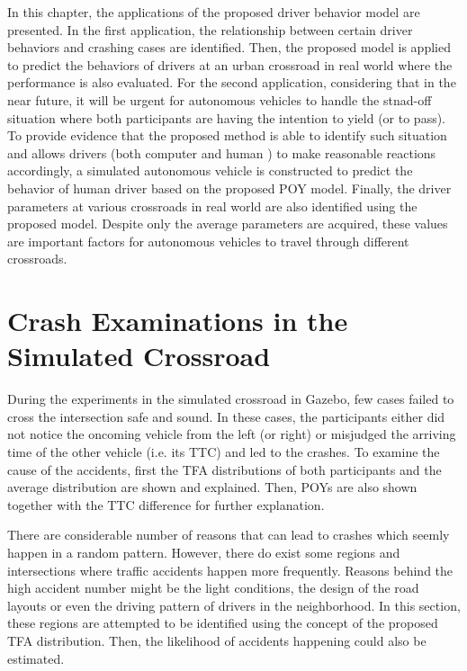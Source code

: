 
In this chapter, the applications of the proposed driver behavior model are presented. In the first application, the relationship between certain driver behaviors and crashing cases are identified. Then, the proposed model is applied to predict the behaviors of drivers at an urban crossroad in real world where the performance is also evaluated. For the second application, considering that in the near future, it will be urgent for autonomous vehicles to handle the stnad-off situation where both participants are having the intention to yield (or to pass). To provide evidence that the proposed method is able to identify such situation and allows drivers (both computer and human ) to make reasonable reactions accordingly, a simulated autonomous vehicle is constructed to predict the behavior of human driver based on the proposed POY model. Finally, the driver parameters at various crossroads in real world are also identified using the proposed model. Despite only the average parameters are acquired, these values are important factors for autonomous vehicles to travel through different crossroads.   





\section{Crash Examinations in the Simulated Crossroad}
\label{sec:CrashSim}

During the experiments in the simulated crossroad in Gazebo, few cases failed to cross the intersection safe and sound. In these cases, the participants either did not notice the oncoming vehicle from the left (or right) or misjudged the arriving time of the other vehicle (i.e. its TTC) and led to the crashes. To examine the cause of the accidents, first the TFA distributions of both participants and the average distribution are shown and explained. Then, POYs are also shown together with the TTC difference for further explanation. 

There are considerable number of reasons that can lead to crashes which seemly happen in a random pattern. However, there do exist some regions and intersections where traffic accidents happen more frequently. Reasons behind the high accident number might be the light conditions, the design of the road layouts or even the driving pattern of drivers in the neighborhood. In this section, these regions are attempted to be identified using the concept of the proposed TFA distribution. Then, the likelihood of accidents happening could also be estimated.

